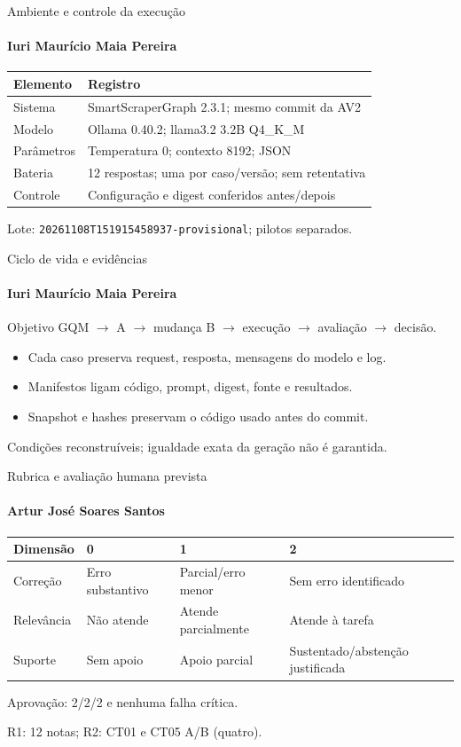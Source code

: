 \documentclass[aspectratio=169,11pt]{beamer}
\newcommand{\pessoa}[1]{\framesubtitle{#1}}
\begin{document}
\begin{frame}{Ambiente e controle da execução}
\pessoa{Iuri Maurício Maia Pereira}
\small\begin{tabular}{@{}lp{10.2cm}@{}}\toprule
Elemento & Registro \\\midrule
Sistema & SmartScraperGraph 2.3.1; mesmo commit da AV2 \\
Modelo & Ollama 0.40.2; llama3.2 3.2B Q4\_K\_M \\
Parâmetros & Temperatura 0; contexto 8192; JSON \\
Bateria & 12 respostas; uma por caso/versão; sem retentativa \\
Controle & Configuração e digest conferidos antes/depois \\\bottomrule
\end{tabular}\par\bigskip
Lote: \texttt{20261108T151915458937-provisional}; pilotos separados.
\end{frame}
\begin{frame}{Ciclo de vida e evidências}
\pessoa{Iuri Maurício Maia Pereira}
Objetivo GQM $\rightarrow$ A $\rightarrow$ mudança B $\rightarrow$ execução $\rightarrow$ avaliação $\rightarrow$ decisão.
\begin{itemize}\setlength{\itemsep}{1em}
\item Cada caso preserva request, resposta, mensagens do modelo e log.
\item Manifestos ligam código, prompt, digest, fonte e resultados.
\item Snapshot e hashes preservam o código usado antes do commit.
\end{itemize}\bigskip
Condições reconstruíveis; igualdade exata da geração não é garantida.
\end{frame}
\begin{frame}{Rubrica e avaliação humana prevista}
\pessoa{Artur José Soares Santos}
\small\begin{tabular}{@{}p{2.1cm}p{3.1cm}p{3.2cm}p{4.8cm}@{}}\toprule
Dimensão & 0 & 1 & 2 \\\midrule
Correção & Erro substantivo & Parcial/erro menor & Sem erro identificado \\
Relevância & Não atende & Atende parcialmente & Atende à tarefa \\
Suporte & Sem apoio & Apoio parcial & Sustentado/abstenção justificada \\\bottomrule
\end{tabular}\par\bigskip
Aprovação: 2/2/2 e nenhuma falha crítica.\par
R1: 12 notas; R2: CT01 e CT05 A/B (quatro).
\end{frame}
\end{document}
